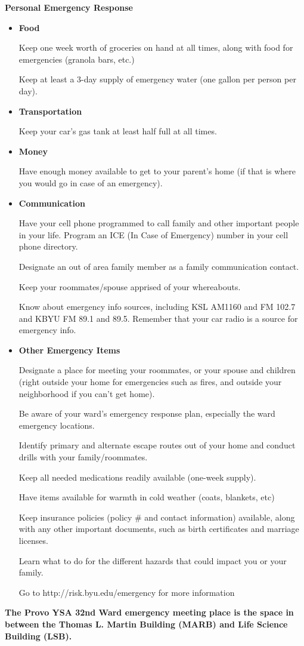 \begin{center}
\textbf{\huge Personal Emergency Response}
\end{center}

\begin{itemize}
\item \textbf{Food}

Keep one week worth of groceries on hand at all times, along with food for emergencies (granola bars, etc.)

Keep at least a 3-day supply of emergency water (one gallon per person per day).

\item \textbf{Transportation}

Keep your car’s gas tank at least half full at all times.

\item \textbf{Money}

Have enough money available to get to your parent’s home (if that is where you would go in case of an emergency).

\item \textbf{Communication}

Have your cell phone programmed to call family and other important people in your life. Program an ICE (In Case of Emergency) number in your cell phone directory.

Designate an out of area family member as a family communication contact.

Keep your roommates/spouse apprised of your whereabouts.

Know about emergency info sources, including KSL AM1160 and FM 102.7 and KBYU FM 89.1 and 89.5. Remember that your car radio is a source for emergency info.

\item \textbf{Other Emergency Items}

Designate a place for meeting your roommates, or your spouse and children (right outside your home for emergencies such as fires, and outside your neighborhood if you can’t get home).

Be aware of your ward’s emergency response plan, especially the ward emergency locations.

Identify primary and alternate escape routes out of your home and conduct drills with your family/roommates.

Keep all needed medications readily available (one-week supply).

Have items available for warmth in cold weather (coats, blankets, etc)

Keep insurance policies (policy \# and contact information) available, along with any other important documents, such as birth certificates and marriage licenses.

Learn what to do for the different hazards that could impact you or your family.

Go to http://risk.byu.edu/emergency for more information
\end{itemize}
\textbf{The Provo YSA 32nd Ward emergency meeting place is the space in between the Thomas L. Martin Building (MARB) and Life Science Building (LSB).}